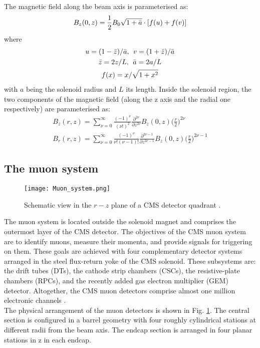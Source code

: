\indent The magnetic field along the beam axis is parameterised as:
\begin{equation}
    B_z(0,z) = \frac{1}{2}B_0\sqrt{1+\Bar{a}}\cdot[f(u)+ f(v)]
\end{equation}
where
\begin{gather}
    u = (1-\Bar{z})/\Bar{a}, \: \: v= (1+\Bar{z})/\Bar{a} \nonumber\\
    \Bar{z} = 2z/L, \: \:  \Bar{a} = 2a/L \nonumber \\
    f(x) = x/\sqrt{1+x^2} \nonumber 
\end{gather}
with $a$ being the solenoid radius and $L$ its length.
Inside the solenoid region, the two components of the magnetic field (along the z axis and the radial one respectively) are parameterised as:
\begin{gather}
    B_z(r,z) = \sum_{\nu = 0}^{\infty} \frac{(-1)^{\nu}}{(\nu!)^2}\frac{\partial^{2\nu}}{\partial z^{2\nu}}B_z(0,z) \bigg(\frac{r}{2}\bigg)^{2\nu} \\
    B_r(r,z) = \sum_{\nu = 0}^{\infty} \frac{(-1)^{\nu}}{\nu!(\nu-1)!}\frac{\partial^{2\nu-1}}{\partial z^{2\nu-1}}B_z(0,z) \bigg(\frac{r}{2}\bigg)^{2\nu-1}
\end{gather}
\subsection{\label{sec:exp_CMS_5}The muon system}
\begin{figure}[htb!]
    \centering
    \texttt{[image: Muon\_system.png]}
    \caption{Schematic view in the $r-z$ plane of a CMS detector quadrant \cite{Sirunyan_2018}.}
    \label{fig:Muon}
\end{figure}
\noindent The muon system \cite{Layter:343814, Sirunyan_2018} is located outside the solenoid magnet and comprises the outermost layer of the CMS detector. The objectives of the CMS muon system are to identify muons, measure their momenta, and provide signals for triggering on them. These goals are achieved with four complementary detector systems arranged in the steel flux-return yoke of the CMS solenoid. These subsystems are: the drift tubes (DTs), the cathode strip chambers (CSCs), the resistive-plate chambers (RPCs), and the recently added gas electron multiplier (GEM) detector. Altogether, the CMS muon detectors comprise almost one million electronic channels \cite{Hayrapetyan:2870088}.\\
\indent The physical arrangement of the muon detectors is shown in Fig. \ref{fig:Muon}. The central section is configured in a barrel geometry with four roughly cylindrical stations at different radii from the beam axis. The endcap section is arranged in four planar stations in z in each endcap.

